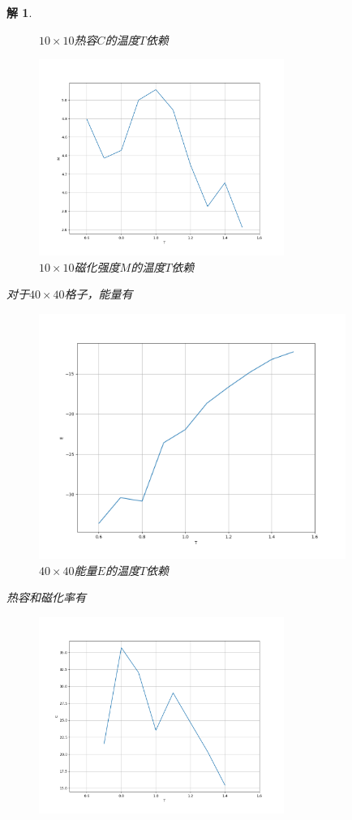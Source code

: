 \documentclass[10pt]{ctexart}
\newtheorem*{solution}{解}
\begin{document}
\begin{solution}
\begin{figure}[H]
\begin{minipage}{0.45\linewidth}
            \caption{$10\times 10$热容$C$的温度$T$依赖}
        \end{minipage}
        \qquad
        \begin{minipage}{0.45\linewidth}
            \centering
            \includegraphics[width=8cm]{M_10.png}
            \caption{$10\times 10$磁化强度$M$的温度$T$依赖}
        \end{minipage}
    \end{figure}
    对于$40\times 40$格子，能量有
    \begin{figure}[H]
        \centering
        \includegraphics[width=10cm]{E_40.png}
        \caption{$40\times 40$能量$E$的温度$T$依赖}
    \end{figure}
    热容和磁化率有
    \begin{figure}[H]
        \centering
        \begin{minipage}{0.45\linewidth}
            \centering
            \includegraphics[width=8cm]{C_40.png}

\end{minipage}
\end{figure}
\end{solution}
\end{document}
